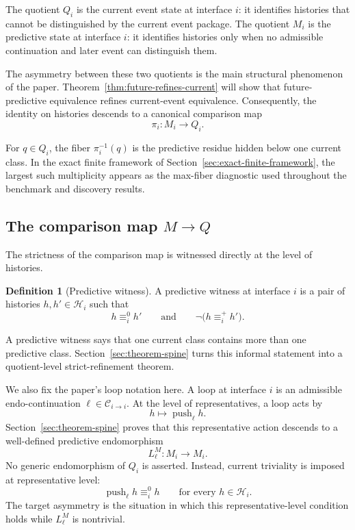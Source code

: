 \documentclass[11pt]{article}
\newcommand{\CurrentQ}{Q}
\newcommand{\PredictiveQ}{M}
\newcommand{\Histories}{\mathcal{H}}
\newcommand{\CurrentEquiv}{\equiv^{0}}
\newcommand{\FutureEquiv}{\equiv^{+}}
\theoremstyle{definition}
\newtheorem{definition}[theorem]{Definition}
\begin{document}
The quotient $\CurrentQ_i$ is the current event state at interface $i$: it identifies histories that cannot be distinguished by the current event package. The quotient $\PredictiveQ_i$ is the predictive state at interface $i$: it identifies histories only when no admissible continuation and later event can distinguish them.

The asymmetry between these two quotients is the main structural phenomenon of the paper. Theorem~\ref{thm:future-refines-current} will show that future-predictive equivalence refines current-event equivalence. Consequently, the identity on histories descends to a canonical comparison map
\begin{equation}
\pi_i : \PredictiveQ_i \to \CurrentQ_i.
\label{eq:comparison-map}
\end{equation}

For $q\in\CurrentQ_i$, the fiber $\pi_i^{-1}(q)$ is the predictive residue hidden below one current class. In the exact finite framework of Section~\ref{sec:exact-finite-framework}, the largest such multiplicity appears as the max-fiber diagnostic used throughout the benchmark and discovery results.

\subsection{The comparison map \texorpdfstring{$\PredictiveQ \to \CurrentQ$}{M to Q}}\label{subsec:rtp-comparison}
The strictness of the comparison map is witnessed directly at the level of histories.

\begin{definition}[Predictive witness]\label{def:predictive-witness}
A predictive witness at interface $i$ is a pair of histories $h,h'\in\Histories_i$ such that
\begin{equation}
h \CurrentEquiv_i h'
\qquad\text{and}\qquad
\neg\bigl(h \FutureEquiv_i h'\bigr).
\label{eq:predictive-witness}
\end{equation}
\end{definition}

A predictive witness says that one current class contains more than one predictive class. Section~\ref{sec:theorem-spine} turns this informal statement into a quotient-level strict-refinement theorem.

We also fix the paper's loop notation here. A loop at interface $i$ is an admissible endo-continuation $\ell\in\mathcal{C}_{i\to i}$. At the level of representatives, a loop acts by
\begin{equation}
h \longmapsto \operatorname{push}_{\ell} h.
\label{eq:loop-representative-action}
\end{equation}
Section~\ref{sec:theorem-spine} proves that this representative action descends to a well-defined predictive endomorphism
\[
L^{\PredictiveQ}_{\ell} : \PredictiveQ_i \to \PredictiveQ_i.
\]
No generic endomorphism of $\CurrentQ_i$ is asserted. Instead, current triviality is imposed at representative level:
\[
\operatorname{push}_{\ell}h \CurrentEquiv_i h
\qquad\text{for every }h\in\Histories_i.
\]
The target asymmetry is the situation in which this representative-level condition holds while $L^{\PredictiveQ}_{\ell}$ is nontrivial.
\end{document}
